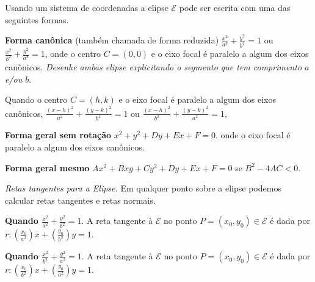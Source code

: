 \documentclass{article}
\begin{document}
 Usando um sistema de coordenadas a elipse $\mathcal{E}$ pode ser escrita com uma das seguintes formas. 
 
 {\bf Forma canônica }(também chamada de forma reduzida) 
 $\frac{x^2}{a^2}+\frac{y^2}{b^2}=1$ ou $\frac{x^2}{b^2}+\frac{y^2}{a^2}=1$, 
 onde o centro $C=(0,0)$ e o eixo focal é paralelo a algum dos eixos canônicos.
 {\it Desenhe ambas elipse explicitando o segmento que tem comprimento $a$ e/ou $b$}.
 
  Quando o centro $C=(h,k)$ e o eixo focal é paralelo a algum dos eixos canônicos, 
  $\frac{(x-h)^2}{a^2}+\frac{(y-k)^2}{b^2}=1$ ou $\frac{(x-h)^2}{b^2}+\frac{(y-k)^2}{a^2}=1$, 

 {\bf Forma geral sem rotação} $x^2+y^{2}+Dy+Ex+F=0$.
 onde o eixo focal é paralelo a algum dos eixos canônicos.
 
 {\bf Forma geral mesmo} $Ax^2+Bxy+Cy^{2}+Dy+Ex+F=0$ se $B^{2}-4AC<0$. \newline
 
 {\it Retas tangentes para a Elipse. }
 Em qualquer ponto sobre a elipse podemos calcular retas tangentes e retas normais.
 
 {\bf Quando $\frac{x^2}{a^2}+\frac{y^2}{b^2}=1$}. 
 A reta tangente à $\mathcal{E}$ no ponto $P=(x_0,y_0) \in \mathcal{E}$ é dada por 
 $ r: (\frac{x_{0}}{a^2})x+(\frac{y_0}{b^{2}})y=1$. 
 
 {\bf Quando $\frac{x^2}{b^2}+\frac{y^2}{a^2}=1$}. 
 A reta tangente à $\mathcal{E}$ no ponto $P=(x_0,y_0) \in \mathcal{E}$ é dada por 
 $ r: (\frac{x_{0}}{b^2})x+(\frac{y_0}{a^{2}})y=1$. \newline
  
\end{document}

